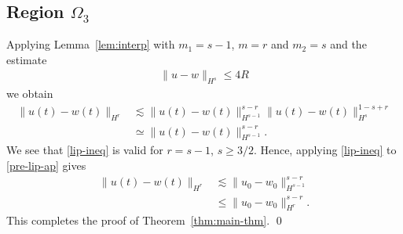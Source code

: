 \documentclass[12pt,reqno]{amsart}
\numberwithin{equation}{section}  %
\numberwithin{figure}{section}
\begin{document}
\subsection{Region $\Omega_{3}$} 
\label{ssec:case-2}
%
%
Applying Lemma~\ref{lem:interp} with $m_{1} = s-1$, $m =r$ and $m_{2} = s$ and
the estimate
%
%
\begin{equation*}
\begin{split}
\|u - w \|_{H^{s}} \le 4R
\end{split}
\end{equation*}
%
%
we obtain
%
%
\begin{equation}
\label{pre-lip-ap}
\begin{split}
\| u(t) - w(t) \|_{H^{r}} & \lesssim \| u(t) - w(t) \|_{H^{s-1}}^{s-r} \|u(t)
- w(t)\|_{H^{s}}^{1-s+r}
\\
& \simeq \| u(t) - w(t) \|_{H^{s-1}}^{s-r}.
\end{split}
\end{equation}
%
%
We see that \eqref{lip-ineq} is valid for  $r = s-1$, $s \ge 3/2$. Hence,
applying \eqref{lip-ineq} to \eqref{pre-lip-ap} gives
%
%
\begin{equation*}
\begin{split}
\| u(t) - w(t) \|_{H^{r}} & \lesssim  \|u_{0} - w_{0}\|_{H^{s-1}}^{s-r} 
\\
& \le
\|u_{0} - w_{0}\|_{H^{r}}^{s-r}.
\end{split}
\end{equation*}
%
This completes the proof of Theorem~\ref{thm:main-thm}. \qed
%
%
%
%
%
%
%
%
%
%
\end{document}
